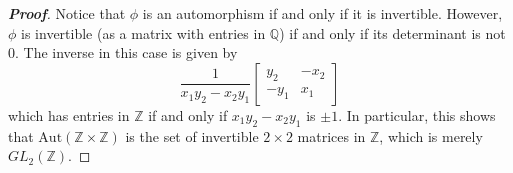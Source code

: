 \documentclass[12pt,leqno]{book}
\theoremstyle{definition}
\newcommand{\Z}{\mathbb{Z}}
\newcommand{\Q}{\mathbb{Q}}
\newenvironment{Proof}{\begin{proof}[\textnormal{\textbf{Proof}}]}{\end{proof}}
\begin{document}
\begin{description}
\begin{Proof}
Notice that $\phi$ is an automorphism if and only if it is invertible. However, $\phi$ is invertible (as a matrix with entries in $\Q$) if and only if its determinant is not 0. The inverse in this case is given by \[\frac{1}{x_1y_2-x_2y_1}\begin{bmatrix}y_2&-x_2\\-y_1&x_1\end{bmatrix}\] which has entries in $\Z$ if and only if $x_1y_2-x_2y_1$ is $\pm1$. In particular, this shows that $\text{Aut}(\Z\times\Z)$ is the set of invertible $2\times2$ matrices in $\Z$, which is merely $GL_2(\Z)$.
\end{Proof}
\end{description}
\end{document}
